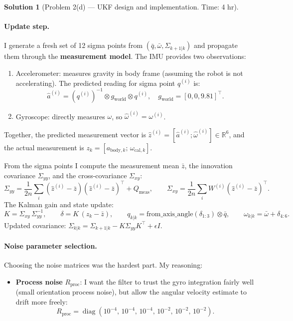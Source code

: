 \documentclass[11pt, reqno, letterpaper]{amsart}
\theoremstyle{plain}
\theoremstyle{definition}
\newtheorem{solution}[theorem]{Solution}
\begin{document}
\begin{solution}[Problem 2(d) — UKF design and implementation. Time: 4 hr]
\paragraph{Update step.}
I generate a fresh set of 12 sigma points from
$(\bar q,\bar\omega,\Sigma_{k+1|k})$ and propagate them through the
\textbf{measurement model}.
The IMU provides two observations:
\begin{enumerate}
  \item Accelerometer: measures gravity in body frame (assuming the robot
    is not accelerating). The predicted reading for sigma point $q^{(i)}$ is:
    \[
      \hat a^{(i)} = (q^{(i)})^{-1}\otimes g_\text{world}\otimes q^{(i)},
      \quad g_\text{world}=[0,0,9.81]^\top.
    \]
  \item Gyroscope: directly measures $\omega$, so
    $\hat\omega^{(i)}=\omega^{(i)}$.
\end{enumerate}
Together, the predicted measurement vector is
$\hat z^{(i)}=[\hat a^{(i)};\hat\omega^{(i)}]\in\mathbb{R}^6$,
and the actual measurement is $z_k=[a_{\text{body},k};\,\omega_{\text{cal},k}]$.

From the sigma points I compute the measurement mean $\bar z$, the
innovation covariance $\Sigma_{yy}$, and the cross-covariance $\Sigma_{xy}$:
\[
  \Sigma_{yy} = \frac{1}{2n}\sum_i(\hat z^{(i)}-\bar z)(\hat z^{(i)}-\bar z)^\top + Q_\text{meas},
  \qquad
  \Sigma_{xy} = \frac{1}{2n}\sum_i W^{(i)}(\hat z^{(i)}-\bar z)^\top.
\]
The Kalman gain and state update:
\[
  K = \Sigma_{xy}\,\Sigma_{yy}^{-1}, \qquad
  \delta = K\,(z_k - \bar z), \qquad
  q_{k|k} = \text{from\_axis\_angle}(\delta_{1:3})\otimes\bar q, \qquad
  \omega_{k|k} = \bar\omega + \delta_{4:6}.
\]
Updated covariance: $\Sigma_{k|k}=\Sigma_{k+1|k}-K\Sigma_{yy}K^\top+\epsilon I$.

\paragraph{Noise parameter selection.}
Choosing the noise matrices was the hardest part.
My reasoning:

\begin{itemize}
  \item \textbf{Process noise} $R_\text{proc}$:
    I want the filter to trust the gyro integration fairly well (small
    orientation process noise), but allow the angular velocity estimate to
    drift more freely:
    \[
      R_\text{proc} = \operatorname{diag}(10^{-4},\,10^{-4},\,10^{-4},\,
                                          10^{-2},\,10^{-2},\,10^{-2}).
    \]


\end{itemize}
\end{solution}
\end{document}
